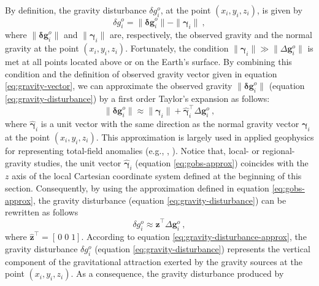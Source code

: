 \documentclass[manuscript]{geophysics}
\begin{document}
By definition, the gravity disturbance $\delta g^{o}_{i}$,
at the point $(x_{i}, y_{i}, z_{i})$, is given by
\begin{equation}
\delta g^{o}_{i} =  \| \mathbf{\delta g}^{o}_{i} \| - \| \boldsymbol{\gamma}_{i} \| \: ,
\label{eq:gravity-disturbance}
\end{equation}
where $\| \mathbf{\delta g}^{o}_{i} \|$ and $\| \boldsymbol{\gamma}_{i} \|$ are,
respectively, the observed gravity and the normal gravity at the
point $(x_{i}, y_{i}, z_{i})$.
Fortunately, the condition $\| \boldsymbol{\gamma}_{i} \| \gg \| \Delta \mathbf{g}^{o}_{i} \|$
is met at all points located above or on the Earth's surface.
By combining this condition and the definition of observed gravity vector
given in equation \ref{eq:gravity-vector}, we can approximate the observed gravity
$\| \mathbf{\delta g}^{o}_{i} \|$ (equation \ref{eq:gravity-disturbance})
by a first order Taylor's expansion as follows:
\begin{equation}
\| \mathbf{\delta g}^{o}_{i} \| \approx \| \boldsymbol{\gamma}_{i} \| + 
\hat{\boldsymbol{\gamma}}_{i}^{\top} \Delta \mathbf{g}^{o}_{i} \: ,
\label{eq:gobs-approx}
\end{equation}
where $\hat{\boldsymbol{\gamma}}_{i}$ is a unit vector with the same 
direction as the normal gravity vector $\boldsymbol{\gamma}_{i}$ at
the point $(x_{i}, y_{i}, z_{i})$.
This approximation is largely used in applied geophysics for representing
total-field anomalies (e.g., \citeauthor{blakely1996}, \citeyear{blakely1996}).
Notice that, local- or regional-gravity studies, the unit
vector $\hat{\boldsymbol{\gamma}}_{i}$ (equation \ref{eq:gobs-approx}) 
coincides with the $z$ axis
of the local Cartesian coordinate system defined
at the beginning of this section. Consequently,
by using the approximation defined in equation \ref{eq:gobs-approx}, 
the gravity disturbance (equation \ref{eq:gravity-disturbance}) can be 
rewritten as follows \begin{equation}
\delta g^{o}_{i} \approx \hat{\mathbf{z}}^{\top} \Delta \mathbf{g}^{o}_{i} \: ,
\label{eq:gravity-disturbance-approx}
\end{equation}
where $\hat{\mathbf{z}}^{\top} = \left[ \, 0 \; 0 \; 1 \right]$.
According to equation \ref{eq:gravity-disturbance-approx},
the gravity disturbance $\delta g^{o}_{i}$ (equation \ref{eq:gravity-disturbance})
represents the vertical component of the gravitational attraction exerted by
the gravity sources at the point $(x_{i}, y_{i}, z_{i})$.
As a consequence, the gravity disturbance produced by
\end{document}
